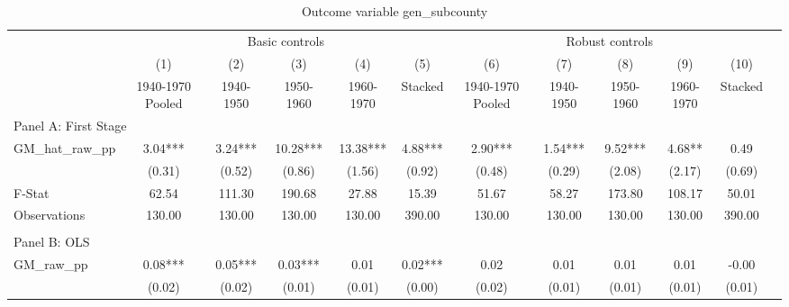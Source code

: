  \begin{table}[htbp]\centering {} \begin{threeparttable} \caption{Outcome variable gen\_subcounty} \begin{tabular}{l*{11}{c}} \toprule
          &\multicolumn{5}{c}{Basic controls}                                   &\multicolumn{5}{c}{Robust controls}                                  \\\cmidrule(lr){2-6}\cmidrule(lr){7-11}
          &\multicolumn{1}{c}{(1)}&\multicolumn{1}{c}{(2)}&\multicolumn{1}{c}{(3)}&\multicolumn{1}{c}{(4)}&\multicolumn{1}{c}{(5)}&\multicolumn{1}{c}{(6)}&\multicolumn{1}{c}{(7)}&\multicolumn{1}{c}{(8)}&\multicolumn{1}{c}{(9)}&\multicolumn{1}{c}{(10)}\\
          &\multicolumn{1}{c}{1940-1970 Pooled}&\multicolumn{1}{c}{1940-1950}&\multicolumn{1}{c}{1950-1960}&\multicolumn{1}{c}{1960-1970}&\multicolumn{1}{c}{Stacked}&\multicolumn{1}{c}{1940-1970 Pooled}&\multicolumn{1}{c}{1940-1950}&\multicolumn{1}{c}{1950-1960}&\multicolumn{1}{c}{1960-1970}&\multicolumn{1}{c}{Stacked}\\
\cmidrule(lr){1-11}
\multicolumn{10}{l}{Panel A: First Stage}\\
\cmidrule(lr){1-11}
GM\_hat\_raw\_pp&      3.04***&      3.24***&     10.28***&     13.38***&      4.88***&      2.90***&      1.54***&      9.52***&      4.68** &      0.49   \\
          &    (0.31)   &    (0.52)   &    (0.86)   &    (1.56)   &    (0.92)   &    (0.48)   &    (0.29)   &    (2.08)   &    (2.17)   &    (0.69)   \\
\midrule
F-Stat    &     62.54   &    111.30   &    190.68   &     27.88   &     15.39   &     51.67   &     58.27   &    173.80   &    108.17   &     50.01   \\
Observations&    130.00   &    130.00   &    130.00   &    130.00   &    390.00   &    130.00   &    130.00   &    130.00   &    130.00   &    390.00   \\
\cmidrule[\heavyrulewidth](lr){1-11} \\ \cmidrule[\heavyrulewidth](lr){1-11}
\multicolumn{10}{l}{Panel B: OLS}\\
\cmidrule(lr){1-11}
GM\_raw\_pp &      0.08***&      0.05***&      0.03***&      0.01   &      0.02***&      0.02   &      0.01   &      0.01   &      0.01   &     -0.00   \\
          &    (0.02)   &    (0.02)   &    (0.01)   &    (0.01)   &    (0.00)   &    (0.02)   &    (0.01)   &    (0.01)   &    (0.01)   &    (0.01)   \\

\end{tabular}
\end{threeparttable}
\end{table}
